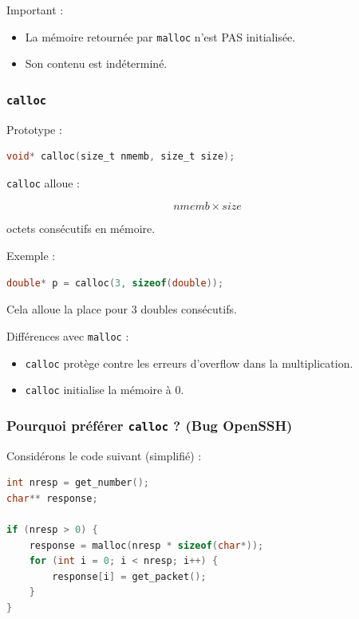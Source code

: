 Important :

\begin{itemize}
    \item La mémoire retournée par \texttt{malloc} n’est PAS initialisée.
    \item Son contenu est indéterminé.
\end{itemize}

\subsubsection{\texttt{calloc}}

Prototype :

\begin{lstlisting}[language=C]
void* calloc(size_t nmemb, size_t size);
\end{lstlisting}

\texttt{calloc} alloue :

\[
nmemb \times size
\]

octets consécutifs en mémoire.

Exemple :

\begin{lstlisting}[language=C]
double* p = calloc(3, sizeof(double));
\end{lstlisting}

Cela alloue la place pour 3 doubles consécutifs.

Différences avec \texttt{malloc} :

\begin{itemize}
    \item \texttt{calloc} protège contre les erreurs d’overflow
          dans la multiplication.
    \item \texttt{calloc} initialise la mémoire à 0.
\end{itemize}

\subsubsection{Pourquoi préférer \texttt{calloc} ? (Bug OpenSSH)}

Considérons le code suivant (simplifié) :

\begin{lstlisting}[language=C]
int nresp = get_number();
char** response;

if (nresp > 0) {
    response = malloc(nresp * sizeof(char*));
    for (int i = 0; i < nresp; i++) {
        response[i] = get_packet();
    }
}
\end{lstlisting}

